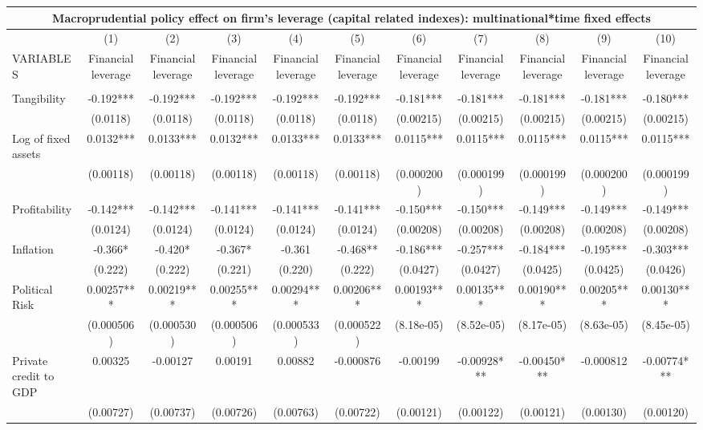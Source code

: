 \begin{tabular}{lcccccccccc}
\multicolumn{11}{c}{Macroprudential policy effect on firm's leverage (capital related indexes): multinational*time fixed effects} \\ \hline
 & (1) & (2) & (3) & (4) & (5) & (6) & (7) & (8) & (9) & (10) \\
VARIABLES & Financial leverage & Financial leverage & Financial leverage & Financial leverage & Financial leverage & Financial leverage & Financial leverage & Financial leverage & Financial leverage & Financial leverage \\ \hline
 &  &  &  &  &  &  &  &  &  &  \\
Tangibility & -0.192*** & -0.192*** & -0.192*** & -0.192*** & -0.192*** & -0.181*** & -0.181*** & -0.181*** & -0.181*** & -0.180*** \\
 & (0.0118) & (0.0118) & (0.0118) & (0.0118) & (0.0118) & (0.00215) & (0.00215) & (0.00215) & (0.00215) & (0.00215) \\
Log of fixed assets & 0.0132*** & 0.0133*** & 0.0132*** & 0.0133*** & 0.0133*** & 0.0115*** & 0.0115*** & 0.0115*** & 0.0115*** & 0.0115*** \\
 & (0.00118) & (0.00118) & (0.00118) & (0.00118) & (0.00118) & (0.000200) & (0.000199) & (0.000199) & (0.000200) & (0.000199) \\
Profitability & -0.142*** & -0.142*** & -0.141*** & -0.141*** & -0.141*** & -0.150*** & -0.150*** & -0.149*** & -0.149*** & -0.149*** \\
 & (0.0124) & (0.0124) & (0.0124) & (0.0124) & (0.0124) & (0.00208) & (0.00208) & (0.00208) & (0.00208) & (0.00208) \\
Inflation & -0.366* & -0.420* & -0.367* & -0.361 & -0.468** & -0.186*** & -0.257*** & -0.184*** & -0.195*** & -0.303*** \\
 & (0.222) & (0.222) & (0.221) & (0.220) & (0.222) & (0.0427) & (0.0427) & (0.0425) & (0.0425) & (0.0426) \\
Political Risk & 0.00257*** & 0.00219*** & 0.00255*** & 0.00294*** & 0.00206*** & 0.00193*** & 0.00135*** & 0.00190*** & 0.00205*** & 0.00130*** \\
 & (0.000506) & (0.000530) & (0.000506) & (0.000533) & (0.000522) & (8.18e-05) & (8.52e-05) & (8.17e-05) & (8.63e-05) & (8.45e-05) \\
Private credit to GDP & 0.00325 & -0.00127 & 0.00191 & 0.00882 & -0.000876 & -0.00199 & -0.00928*** & -0.00450*** & -0.000812 & -0.00774*** \\
 & (0.00727) & (0.00737) & (0.00726) & (0.00763) & (0.00722) & (0.00121) & (0.00122) & (0.00121) & (0.00130) & (0.00120) \\

\end{tabular}

